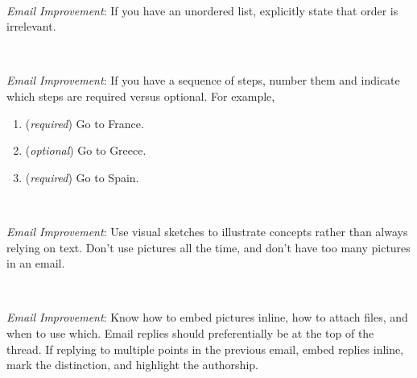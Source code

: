 \ \\
\begin{samepage}
\textit{Email Improvement}: If you have an unordered list, explicitly state that order is irrelevant.
\end{samepage}

\ \\
\begin{samepage}
\textit{Email Improvement}: If you have a sequence of steps, number them and indicate which steps are required versus optional. For example,
\begin{enumerate}
    \item (\textit{required}) Go to France.
    \item (\textit{optional}) Go to Greece.
    \item (\textit{required}) Go to Spain.
\end{enumerate}
\end{samepage}

\ \\
\begin{samepage}
\textit{Email Improvement}: Use visual sketches to illustrate concepts rather than always relying on text. Don't use pictures all the time, and don't have too many pictures in an email. 
\end{samepage}

\ \\
\begin{samepage}
\textit{Email Improvement}: Know how to embed pictures inline, how to attach files, and when to use which. 
Email replies should preferentially be at the top of the thread. 
If replying to multiple points in the previous email, embed replies inline, mark the distinction, and highlight the authorship. 
\end{samepage}

